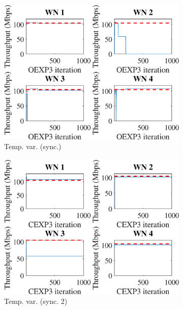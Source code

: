\documentclass[preprint,12pt]{article}
\begin{document}
\begin{figure}[h!]
\begin{subfigure}[b]{.3\textwidth}
		\includegraphics[width=\textwidth]{images/temporal_individual_tpt_OEXP3}
		\caption{Temp. var.  (sync.)}\label{fig:temporal_individual_tpt_OEXP3}
	\end{subfigure}
	\begin{subfigure}[b]{.3\textwidth}
		\includegraphics[width=\textwidth]{images/temporal_individual_tpt_CEXP3}
		\caption{Temp. var.  (sync.  2)}\label{fig:temporal_individual_tpt_CEXP3}
	\end{subfigure}\\
	\begin{subfigure}[b]{.3\textwidth}

\end{subfigure}
\end{figure}
\end{document}
